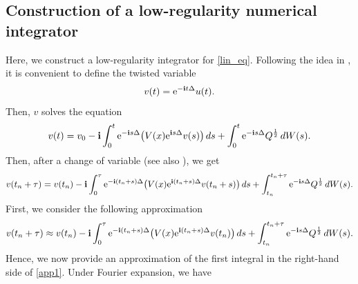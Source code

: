 \documentclass[a4paper]{amsart}
\begin{document}
\subsection{Construction of a low-regularity numerical integrator}
Here, we construct a low-regularity integrator for \eqref{lin_eq}. Following the idea in \cite{os_ka}, it is convenient to define the twisted variable
\begin{equation}
    \label{twis_def}
    v(t)={\rm e}^{-{\bf i}t \Delta} u(t).
\end{equation}
Then, $v$ solves the equation
$$
v(t) =  v_0-{\bf i}\int_{0}^{t}{\rm e}^{-{\bf i}s\Delta}\big(V(x){\rm e}^{{\bf i} s \Delta}v(s)\big)\,ds+\int_{0}^{t}{\rm e}^{-{\bf i}s \Delta}Q^{\frac{1}{2}}\,dW(s).
$$
Then, after a change of variable (see also \cite{os_ka,fe_ka}), we get 
$$
v(t_n+\tau)=v(t_n)-{\bf i}\int_{0}^{\tau}{\rm e}^{-{\bf i}(t_n+s)\Delta}\big(V(x){\rm e}^{{\bf i}(t_n+s)\Delta}v(t_n+s)\big)\,ds+\int_{t_n}^{t_n+\tau}{\rm e}^{-{\bf i}s \Delta}Q^{\frac{1}{2}}\,dW(s).
$$
First, we consider the following approximation
\begin{equation}
    \label{app1}
v(t_n+\tau) \approx v(t_n)-{\bf i}\int_{0}^{\tau}{\rm e}^{-{\bf i}(t_n+s)\Delta}\big(V(x){\rm e}^{{\bf i}(t_n+s)\Delta}v(t_n)\big)\,ds+\int_{t_n}^{t_n+\tau}{\rm e}^{-{\bf i}s \Delta}Q^{\frac{1}{2}}\,dW(s).
\end{equation}
Hence, we now provide an approximation of the first integral in the right-hand side of \eqref{app1}. Under Fourier expansion, we have
\end{document}

